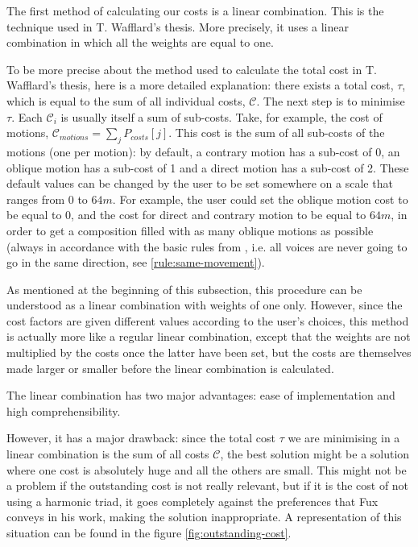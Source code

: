 The first method of calculating our costs is a linear combination. This is the technique used in T. Wafflard's thesis. More precisely, it uses a linear combination in which all the weights are equal to one.



To be more precise about the method used to calculate the total cost in T. Wafflard's thesis, here is a more detailed explanation: there exists a total cost, $\tau$, which is equal to the sum of all individual costs, $\mathcal{C}$. The next step is to minimise $\tau$. Each $\mathcal{C}_i$ is usually itself a sum of sub-costs. Take, for example, the cost of motions, $\mathcal{C}_{motions} = \sum_j P_{costs}[j] $. This cost is the sum of all sub-costs of the motions (one per motion): by default, a contrary motion has a sub-cost of 0, an oblique motion has a sub-cost of 1 and a direct motion has a sub-cost of 2. These default values can be changed by the user to be set somewhere on a scale that ranges from $0$ to $64m$. For example, the user could set the oblique motion cost to be equal to $0$, and the cost for direct and contrary motion to be equal to $64m$, in order to get a composition filled with as many oblique motions as possible (always in accordance with the basic rules from \gap, i.e. all voices are never going to go in the same direction, see \ref{rule:same-movement}).

As mentioned at the beginning of this subsection, this procedure can be understood as a linear combination with weights of one only. However, since the cost factors are given different values according to the user's choices, this method is actually more like a regular linear combination, except that the weights are not multiplied by the costs once the latter have been set, but the costs are themselves made larger or smaller before the linear combination is calculated.

The linear combination has two major advantages: ease of implementation and high comprehensibility.


However, it has a major drawback: since the total cost $\tau$ we are minimising in a linear combination is the sum of all costs $\mathcal{C}$, the best solution might be a solution where one cost is absolutely huge and all the others are small. This might not be a problem if the outstanding cost is not really relevant, but if it is the cost of not using a harmonic triad, it goes completely against the preferences that Fux conveys in his work, making the solution inappropriate. A representation of this situation can be found in the figure \ref{fig:outstanding-cost}.

